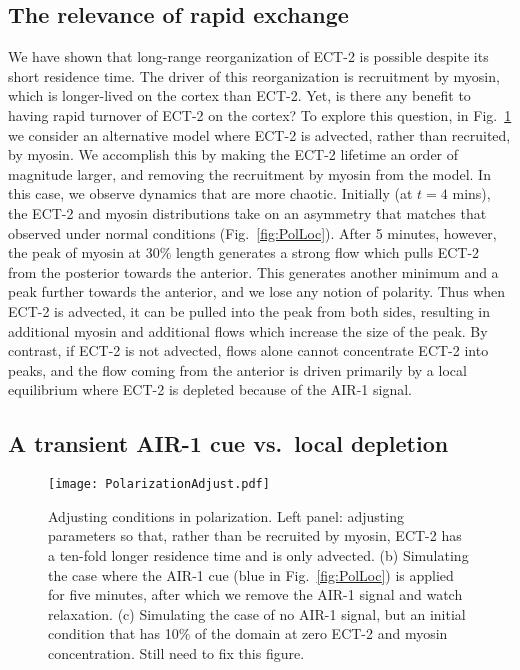 \documentclass[11pt]{article}
\newcommand{\red}[1]{\color{red}#1\normalcolor}
\begin{document}
\subsection{The relevance of rapid exchange}
We have shown that long-range reorganization of ECT-2 is possible despite its short residence time. The driver of this reorganization is recruitment by myosin, which is longer-lived on the cortex than ECT-2. Yet, is there any benefit to having rapid turnover of ECT-2 on the cortex? To explore this question, in Fig.\ \ref{fig:CueVsIC} we consider an alternative model where ECT-2 is advected, rather than recruited, by myosin. We accomplish this by making the ECT-2 lifetime an order of magnitude larger, and removing the recruitment by myosin from the model. In this case, we observe dynamics that are more chaotic. Initially (at $t=4$ mins), the ECT-2 and myosin distributions take on an asymmetry that matches that observed under normal conditions (Fig.\ \ref{fig:PolLoc}). After 5 minutes, however, the peak of myosin at 30\% length generates a strong flow which pulls ECT-2 from the posterior towards the anterior. This generates another minimum and a peak further towards the anterior, and we lose any notion of polarity. Thus when ECT-2 is advected, it can be pulled into the peak from both sides, resulting in additional myosin and additional flows which increase the size of the peak. By contrast, if ECT-2 is not advected, flows alone cannot concentrate ECT-2 into peaks, and the flow coming from the anterior is driven primarily by a local equilibrium where ECT-2 is depleted because of the AIR-1 signal. 

\subsection{A transient AIR-1 cue vs.\ local depletion}
\begin{figure}
\centering
\texttt{[image: PolarizationAdjust.pdf]}
\caption{\label{fig:CueVsIC}Adjusting conditions in polarization. Left panel: adjusting parameters so that, rather than be recruited by myosin, ECT-2 has a ten-fold longer residence time and is only advected. (b) Simulating the case where the AIR-1 cue (blue in Fig.\ \ref{fig:PolLoc}) is applied for five minutes, after which we remove the AIR-1 signal and watch relaxation. (c) Simulating the case of no AIR-1 signal, but an initial condition that has 10\% of the domain at zero ECT-2 and myosin concentration. \red{Still need to fix this figure.}}
\end{figure}
\end{document}
